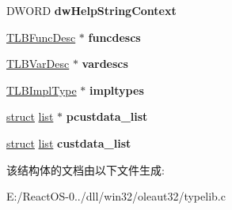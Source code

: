 \begin{DoxyCompactItemize}
D\+W\+O\+RD {\bfseries dw\+Help\+String\+Context}
\item 
\mbox{\label{structtag_i_type_info_impl_a8d3b58d3df04efb251972a39efd58673}} 
\hyperlink{structtag_t_l_b_func_desc}{T\+L\+B\+Func\+Desc} $\ast$ {\bfseries funcdescs}
\item 
\mbox{\label{structtag_i_type_info_impl_ad4379f8cadbd2a9480a93cf87d5a6846}} 
\hyperlink{structtag_t_l_b_var_desc}{T\+L\+B\+Var\+Desc} $\ast$ {\bfseries vardescs}
\item 
\mbox{\label{structtag_i_type_info_impl_ae93152ed09dca30bdd921dae8410e858}} 
\hyperlink{structtag_t_l_b_impl_type}{T\+L\+B\+Impl\+Type} $\ast$ {\bfseries impltypes}
\item 
\mbox{\label{structtag_i_type_info_impl_a4b61ed4891654fe0be298058dd80022a}} 
\hyperlink{interfacestruct}{struct} \hyperlink{classlist}{list} $\ast$ {\bfseries pcustdata\+\_\+list}
\item 
\mbox{\label{structtag_i_type_info_impl_adf443f7f09d0a6b081bea7f206b5f509}} 
\hyperlink{interfacestruct}{struct} \hyperlink{classlist}{list} {\bfseries custdata\+\_\+list}
\end{DoxyCompactItemize}


该结构体的文档由以下文件生成\+:\begin{DoxyCompactItemize}
\item 
E\+:/\+React\+O\+S-\/0../dll/win32/oleaut32/typelib.\+c\end{DoxyCompactItemize}
